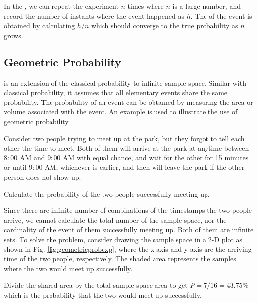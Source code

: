 In the , we can repeat the experiment $n$ times where $n$ is a large number, and record the number of instants where the event happened as $h$. The  of the event is obtained by calculating $h/n$ which should converge to the true probability as $n$ grows.

\subsection{Geometric Probability}

 is an extension of the classical probability to infinite sample space. Similar with classical probability, it assumes that all elementary events share the same probability. The probability of an event can be obtained by measuring the area or volume associated with the event. An example is used to illustrate the use of geometric probability.

\begin{shortbox}
Consider two people trying to meet up at the park, but they forgot to tell each other the time to meet. Both of them will arrive at the park at anytime between $8:00$ AM and $9:00$ AM with equal chance, and wait for the other for 15 minutes or until $9:00$ AM, whichever is earlier, and then will leave the park if the other person does not show up.

Calculate the probability of the two people successfully meeting up.

\end{shortbox}

Since there are infinite number of combinations of the timestamps the two people arrive, we cannot calculate the total number of the sample space, nor the cardinality of the event of them successfully meeting up. Both of them are infinite sets. To solve the problem, consider drawing the sample space in a 2-D plot as shown in Fig. \ref{fig:geometricprobexp}, where the x-axis and y-axis are the arriving time of the two people, respectively. The shaded area represents the samples where the two would meet up successfully.

Divide the shared area by the total sample space area to get $P=7/16=43.75\%$ which is the probability that the two would meet up successfully.


